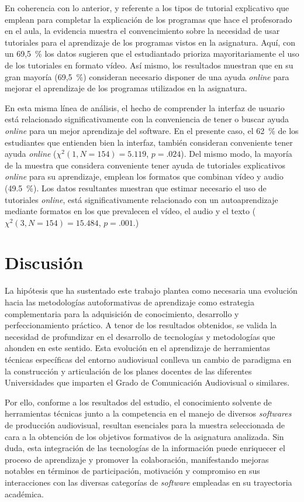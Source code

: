 \documentclass[spanish]{textolivre}
\begin{document}
En coherencia con lo anterior, y referente a los tipos de tutorial explicativo que emplean para completar la explicación de los programas que hace el profesorado en el aula, la evidencia muestra el convencimiento sobre la necesidad de usar tutoriales para el aprendizaje de los programas vistos en la asignatura. Aquí, con un 69,5~\% los datos sugieren que el estudiantado prioriza mayoritariamente el uso de los tutoriales en formato vídeo. Así mismo, los resultados muestran que en su gran mayoría (69,5~\%) consideran necesario disponer de una ayuda \textit{online} para mejorar el aprendizaje de los programas utilizados en la asignatura. 

En esta misma línea de análisis, el hecho de comprender la interfaz de usuario está relacionado significativamente con la conveniencia de tener o buscar ayuda \textit{online} para un mejor aprendizaje del software. En el presente caso, el 62~\% de los estudiantes que entienden bien la interfaz, también consideran conveniente tener ayuda \textit{online} ($\chi^{2}(1,N=154)=5.119$, $p=.024$). Del mismo modo, la mayoría de la muestra que considera conveniente tener ayuda de tutoriales explicativos \textit{online} para su aprendizaje, emplean los formatos que combinan vídeo y audio (49.5~\%). Los datos resultantes muestran que estimar necesario el uso de tutoriales \textit{online}, está significativamente relacionado con un autoaprendizaje mediante formatos en los que prevalecen el vídeo, el audio y el texto ($\chi^{2}(3,N=154)=15.484$, $p=.001$.)

\section{Discusión}\label{sec-format-simple}
La hipótesis que ha sustentado este trabajo plantea como necesaria una evolución hacia las metodologías autoformativas de aprendizaje como estrategia complementaria para la adquisición de conocimiento, desarrollo y perfeccionamiento práctico. A tenor de los resultados obtenidos, se valida la necesidad de profundizar en el desarrollo de tecnologías y metodologías que ahonden en este sentido. Esta evolución en el aprendizaje de herramientas técnicas específicas del entorno audiovisual conlleva un cambio de paradigma en la construcción y articulación de los planes docentes de las diferentes Universidades que imparten el Grado de Comunicación Audiovisual o similares.

Por ello, conforme a los resultados del estudio, el conocimiento solvente de herramientas técnicas junto a la competencia en el manejo de diversos \textit{softwares} de producción audiovisual, resultan esenciales para la muestra seleccionada de cara a la obtención de los objetivos formativos de la asignatura analizada. Sin duda, esta integración de las tecnologías de la información puede enriquecer el proceso de aprendizaje y promover la colaboración, manifestando mejoras notables en términos de participación, motivación y compromiso en sus interacciones con las diversas categorías de \textit{software} empleadas en su trayectoria académica.
\end{document}
